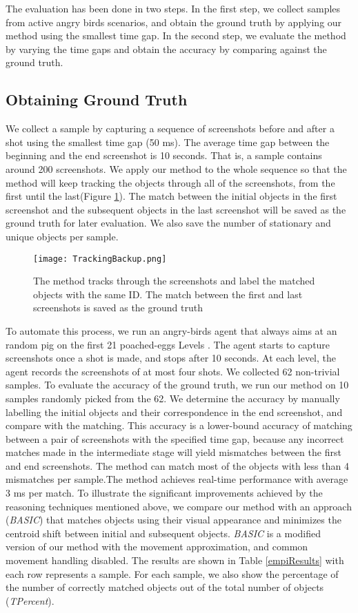 \documentclass[letterpaper]{article}
\begin{document}
The evaluation has been done in two steps. In the first step, we collect samples from active angry birds scenarios, and obtain the ground truth by applying our method using the smallest time gap. In the second step, we evaluate the method by varying the time gaps and obtain the accuracy by comparing against the ground truth.

 
\subsection{Obtaining Ground Truth}

We collect a sample by capturing a sequence of screenshots before and after a shot using the smallest time gap (50 ms). The average time gap between the beginning and the end screenshot is 10 seconds. That is, a sample contains around 200 screenshots.  We apply our method to the whole sequence so that the method will keep tracking the objects through all of the screenshots, from the first until the last(Figure \ref{Tracking}). The match between the initial objects in the first screenshot and the subsequent objects in the last screenshot will be saved as the ground truth for later evaluation. We also save the number of stationary and unique objects per sample.

\begin{figure}[h!]
\centering\texttt{[image: TrackingBackup.png]}\caption{The method tracks through the screenshots and label the matched objects with the same ID. The match between the first and last screenshots is saved as the ground truth }
\label{Tracking}
\end{figure}

To automate this process, we run an angry-birds agent that always aims at an random pig on the first 21 poached-eggs Levels \cite{abGame}. The agent starts to capture screenshots once a shot is made, and stops after 10 seconds. At each level, the agent records the screenshots of at most four shots. We collected 62 non-trivial samples. To evaluate the accuracy of the ground truth, we run our method on 10 samples randomly picked from the 62. We determine the accuracy by manually labelling the initial objects and their correspondence in the end screenshot, and compare with the matching. This accuracy is a lower-bound accuracy of matching between a pair of screenshots with the specified time gap, because any incorrect matches made in the intermediate stage will yield mismatches between the first and end screenshots.  
The method can match most of the objects with less than 4 mismatches per sample.The method achieves real-time performance with average 3 ms per match. To illustrate the significant improvements achieved by the reasoning techniques mentioned above, we compare our method with an approach (\emph{BASIC}) that matches objects using their visual appearance and minimizes the centroid shift between initial and subsequent objects. \emph{BASIC} is a modified version of our method with the movement approximation, and common movement handling disabled. The results are shown in Table \ref{empiResults} with each row represents a sample. For each sample, we also show the percentage of the number of correctly matched objects out of the total number of objects (\emph{TPercent}).
\end{document}
